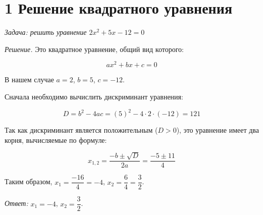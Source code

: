 \documentclass{article}
\begin{document}
\section*{1 Решение квадратного уравнения}

\textit{Задача: решить уравнение $2x^2 + 5x - 12 = 0$}

\textit{Решение.} Это квадратное уравнение, общий вид которого:

\[
ax^2 + bx + c = 0
\]

В нашем случае $a = 2$, $b = 5$, $c = -12$.

Сначала необходимо вычислить дискриминант уравнения:

\[
D = b^2 - 4ac = (5)^2 - 4 \cdot 2 \cdot (-12) = 121
\]

Так как дискриминант является положительным ($D > 0$), это уравнение имеет два корня, вычисляемые по формуле:

\[
x_{1,2} = \frac{-b \pm \sqrt{D}}{2a} = \frac{-5 \pm 11}{4}
\]

Таким образом, $x_1 = \dfrac{\scriptstyle -16}{\scriptstyle 4} = -4$, $x_2 = \dfrac{\scriptstyle 6}{\scriptstyle 4} = \dfrac{\scriptstyle 3}{\scriptstyle 2}$.

\hspace{5mm} \textit{Ответ:} $x_1 = -4$, $x_2 = \dfrac{\scriptstyle 3}{\scriptstyle 2}$.
\end{document}
